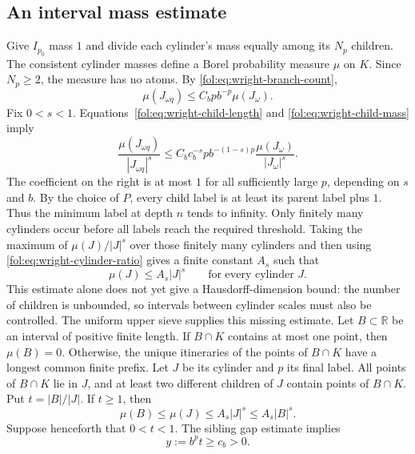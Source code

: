 \documentclass[11pt,a4paper]{article}
\theoremstyle{definition}
\theoremstyle{remark}
\numberwithin{equation}{section}
\begin{document}
\subsection{An interval mass estimate}
Give $I_{p_0}$ mass $1$ and divide each cylinder's mass equally among its $N_p$ children. The consistent cylinder masses define a Borel
probability measure $\mu$ on $K$. Since $N_p\ge2$, the measure has no atoms. By \eqref{fol:eq:wright-branch-count},
\begin{equation}\label{fol:eq:wright-child-mass}
 \mu(J_{\omega q})\le C_b p b^{-p}\mu(J_\omega).
\end{equation}
Fix $0<s<1$. Equations~\eqref{fol:eq:wright-child-length} and
\eqref{fol:eq:wright-child-mass} imply
\begin{equation}\label{fol:eq:wright-cylinder-ratio}
 \frac{\mu(J_{\omega q})}{|J_{\omega q}|^s}
 \le C_b c_b^{-s}p b^{-(1-s)p}
       \frac{\mu(J_\omega)}{|J_\omega|^s}.
\end{equation}
The coefficient on the right is at most $1$ for all sufficiently large $p$, depending on $s$ and $b$. By the choice of $P$, every child
label is at least its parent label plus $1$. Thus the minimum label at depth $n$ tends to infinity. Only finitely many cylinders occur before
all labels reach the required threshold. Taking the maximum of
$\mu(J)/|J|^s$ over those finitely many cylinders and then using
\eqref{fol:eq:wright-cylinder-ratio} gives a finite constant $A_s$ such that
\begin{equation}\label{fol:eq:wright-cylinder-frostman}
 \mu(J)\le A_s|J|^s
 \qquad\text{for every cylinder }J.
\end{equation}
This estimate alone does not yet give a Hausdorff-dimension bound: the number of children is unbounded, so intervals between cylinder
scales must also be controlled. The uniform upper sieve supplies this missing estimate.
Let $B\subset\mathbb R$ be an interval of positive finite length. If $B\cap K$ contains at most one point, then $\mu(B)=0$. Otherwise,
the unique itineraries of the points of $B\cap K$ have a longest common finite prefix. Let $J$ be its cylinder and $p$ its final label. All
points of $B\cap K$ lie in $J$, and at least two different children of
$J$ contain points of $B\cap K$.
Put $t=|B|/|J|$. If $t\ge1$, then
\[
 \mu(B)\le\mu(J)\le A_s|J|^s\le A_s|B|^s.
\]
Suppose henceforth that $0<t<1$. The sibling gap estimate implies
\begin{equation}\label{fol:eq:wright-splitting-scale}
 y:=b^pt\ge c_b>0.
\end{equation}
\end{document}
